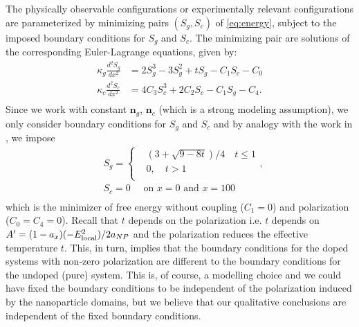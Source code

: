 \documentclass[reprint,amsfonts,amsmath,amssymb,aps,pre,floatfix,10pt]{revtex4-1}
\newcommand\n{\mathbf{n}}
\begin{document}
The physically observable configurations or experimentally relevant configurations are parameterized by minimizing pairs $(S_g, S_c)$ of \eqref{eq:energy}, subject to the imposed boundary conditions for $S_g$ and $S_c$. The minimizing pair are solutions of the corresponding Euler-Lagrange equations, given by:
\begin{equation}\label{EL_S}
\begin{aligned}
  \kappa_g \frac{d^2 S_g}{d x^2} &= 2 S_g^3 - 3  S_g^2 +  t  S_g - C_1 S_c - C_0  \\
  \kappa_c \frac{d^2 S_c}{d x^2} &=4 C_3 S_c^3+ 2 C_2 S_c - C_1 S_g - C_4.  \\
  \end{aligned}
\end{equation}
Since we work with constant $\n_g$, $\n_c$ (which is a strong modeling assumption), we only consider boundary conditions for $S_g$ and $S_c$ and by analogy with the work in \cite{patranabish2019one_37}, we impose 
\begin{equation}\label{BC_t}
\begin{aligned}
  & S_g = \begin{cases} 
    & (3+\sqrt{9-8 t}) / 4 \quad t \leq 1 \\ 
    & 0, \quad t > 1 \\
  \end{cases},  \\  
 &  S_c=0 \quad \text { on } x=0 \text { and } x=100 \\
  \end{aligned}
\end{equation}
which is the minimizer of free energy without coupling ($C_1 = 0$) and polarization ($C_0 = C_4 = 0$).
Recall that $t$ depends on the polarization i.e. $t$ depends on $A' = (1 - a_x) (- E_{\rm local}^2)/ 2 a_{NP}$ and the polarization reduces the effective temperature $t$. This, in turn, implies that the boundary conditions for the doped systems with non-zero polarization are different to the boundary conditions for the undoped (pure) system. This is, of course, a modelling choice and we could have fixed the boundary conditions to be independent of the polarization induced by the nanoparticle domains, but we believe that our qualitative conclusions are independent of the fixed boundary conditions.
\end{document}
